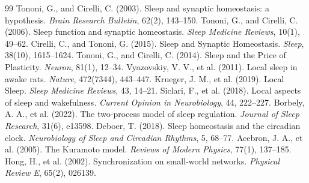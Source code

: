 \documentclass[11pt,a4paper]{article}
\begin{document}
\begin{thebibliography}{99}
 Tononi, G., and Cirelli, C. (2003). Sleep and synaptic homeostasis: a hypothesis. \textit{Brain Research Bulletin}, 62(2), 143--150.
 Tononi, G., and Cirelli, C. (2006). Sleep function and synaptic homeostasis. \textit{Sleep Medicine Reviews}, 10(1), 49--62.
 Cirelli, C., and Tononi, G. (2015). Sleep and Synaptic Homeostasis. \textit{Sleep}, 38(10), 1615--1624.
 Tononi, G., and Cirelli, C. (2014). Sleep and the Price of Plasticity. \textit{Neuron}, 81(1), 12--34.
 Vyazovskiy, V. V., et al. (2011). Local sleep in awake rats. \textit{Nature}, 472(7344), 443--447.
 Krueger, J. M., et al. (2019). Local Sleep. \textit{Sleep Medicine Reviews}, 43, 14--21.
 Siclari, F., et al. (2018). Local aspects of sleep and wakefulness. \textit{Current Opinion in Neurobiology}, 44, 222--227.
 Borbely, A. A., et al. (2022). The two-process model of sleep regulation. \textit{Journal of Sleep Research}, 31(6), e13598.
 Deboer, T. (2018). Sleep homeostasis and the circadian clock. \textit{Neurobiology of Sleep and Circadian Rhythms}, 5, 68--77.
 Acebron, J. A., et al. (2005). The Kuramoto model. \textit{Reviews of Modern Physics}, 77(1), 137--185.
 Hong, H., et al. (2002). Synchronization on small-world networks. \textit{Physical Review E}, 65(2), 026139.
\end{thebibliography}
\end{document}
